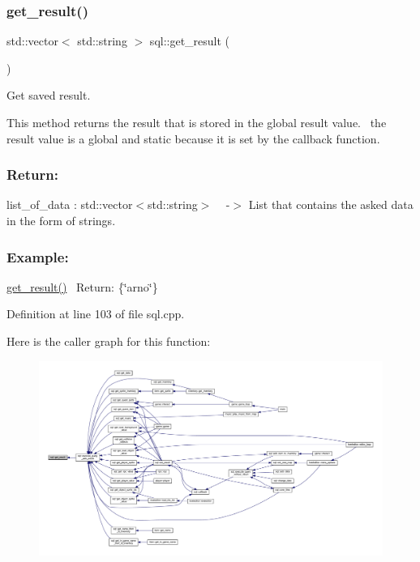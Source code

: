 \subsubsection{\texorpdfstring{get\+\_\+result()}{get\_result()}}
{\footnotesize\ttfamily std\+::vector$<$ std\+::string $>$ sql\+::get\+\_\+result (\begin{DoxyParamCaption}{ }\end{DoxyParamCaption})\hspace{0.3cm}{\ttfamily [static]}}



Get saved result. 

This method returns the result that is stored in the global result value.~\newline
the result value is a global and static because it is set by the callback function.~\newline
 \subsubsection*{Return\+: }

list\+\_\+of\+\_\+data \+: std\+::vector$<$std\+::string$>$ ~\newline
-\/$>$ List that contains the asked data in the form of strings.

\subsubsection*{Example\+: }

\hyperlink{classsql_ad4d8bdf41eede1ae1363d0be8a2f60a9}{get\+\_\+result()}~\newline
Return\+: \{\char`\"{}arno\char`\"{}\} 

Definition at line 103 of file sql.\+cpp.

Here is the caller graph for this function\+:
\nopagebreak
\begin{figure}[H]
\begin{center}
\leavevmode
\includegraphics[width=350pt]{classsql_ad4d8bdf41eede1ae1363d0be8a2f60a9_icgraph}
\end{center}
\end{figure}
\mbox{\label{classsql_a060764a845c3a26c99c6f15470df9634}} 
